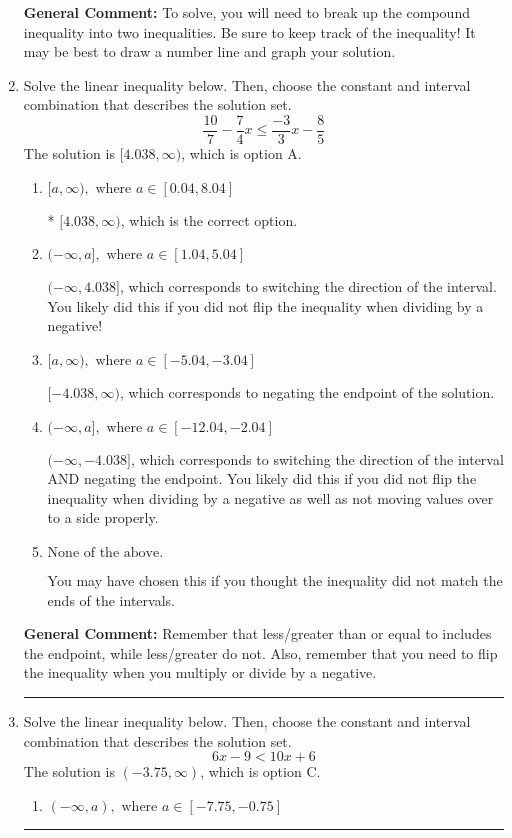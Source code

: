 \documentclass{extbook}[14pt]
\newcommand{\litem}[1]{\item #1

\rule{\textwidth}{0.4pt}}
\begin{document}
\begin{enumerate}
{\begin{enumerate}[label=\Alph*.]
\end{enumerate}

\textbf{General Comment:} To solve, you will need to break up the compound inequality into two inequalities. Be sure to keep track of the inequality! It may be best to draw a number line and graph your solution.
}
\litem{
Solve the linear inequality below. Then, choose the constant and interval combination that describes the solution set.
\[ \frac{10}{7} - \frac{7}{4} x \leq \frac{-3}{3} x - \frac{8}{5} \]
The solution is \( [4.038, \infty) \), which is option A.\begin{enumerate}[label=\Alph*.]
\item \( [a, \infty), \text{ where } a \in [0.04, 8.04] \)

* $[4.038, \infty)$, which is the correct option.
\item \( (-\infty, a], \text{ where } a \in [1.04, 5.04] \)

 $(-\infty, 4.038]$, which corresponds to switching the direction of the interval. You likely did this if you did not flip the inequality when dividing by a negative!
\item \( [a, \infty), \text{ where } a \in [-5.04, -3.04] \)

 $[-4.038, \infty)$, which corresponds to negating the endpoint of the solution.
\item \( (-\infty, a], \text{ where } a \in [-12.04, -2.04] \)

 $(-\infty, -4.038]$, which corresponds to switching the direction of the interval AND negating the endpoint. You likely did this if you did not flip the inequality when dividing by a negative as well as not moving values over to a side properly.
\item \( \text{None of the above}. \)

You may have chosen this if you thought the inequality did not match the ends of the intervals.
\end{enumerate}

\textbf{General Comment:} Remember that less/greater than or equal to includes the endpoint, while less/greater do not. Also, remember that you need to flip the inequality when you multiply or divide by a negative.
}
\litem{
Solve the linear inequality below. Then, choose the constant and interval combination that describes the solution set.
\[ 6x -9 < 10x + 6 \]
The solution is \( (-3.75, \infty) \), which is option C.\begin{enumerate}[label=\Alph*.]
\item \( (-\infty, a), \text{ where } a \in [-7.75, -0.75] \)


\end{enumerate}}
\end{enumerate}
\end{document}
